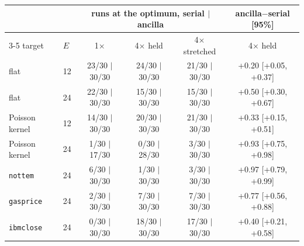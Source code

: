 \begin{tabular}{llcccc}\toprule
 & & \multicolumn{3}{c}{runs at the optimum, serial $|$ ancilla} & ancilla$-$serial [95\%] \\
\cmidrule(lr){3-5}
target & $E$ & 1$\times$ & 4$\times$ held & 4$\times$ stretched & 4$\times$ held \\\midrule
flat & 12 & 23/30 $|$ 30/30 & 24/30 $|$ 30/30 & 21/30 $|$ 30/30 & +0.20 [+0.05, +0.37] \\
flat & 24 & 22/30 $|$ 30/30 & 15/30 $|$ 30/30 & 15/30 $|$ 30/30 & +0.50 [+0.30, +0.67] \\
Poisson kernel & 12 & 14/30 $|$ 30/30 & 20/30 $|$ 30/30 & 21/30 $|$ 30/30 & +0.33 [+0.15, +0.51] \\
Poisson kernel & 24 & 1/30 $|$ 17/30 & 0/30 $|$ 28/30 & 3/30 $|$ 30/30 & +0.93 [+0.75, +0.98] \\
\texttt{nottem} & 24 & 6/30 $|$ 30/30 & 1/30 $|$ 30/30 & 3/30 $|$ 30/30 & +0.97 [+0.79, +0.99] \\
\texttt{gasprice} & 24 & 2/30 $|$ 30/30 & 7/30 $|$ 30/30 & 7/30 $|$ 30/30 & +0.77 [+0.56, +0.88] \\
\texttt{ibmclose} & 24 & 0/30 $|$ 30/30 & 18/30 $|$ 30/30 & 17/30 $|$ 30/30 & +0.40 [+0.21, +0.58] \\
\bottomrule
\end{tabular}
